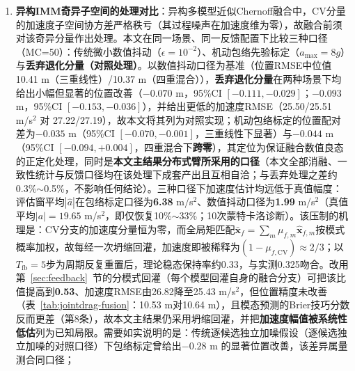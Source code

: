 \documentclass[UTF8,a4paper,zihao=-4]{ctexart}
\begin{document}
\begin{enumerate}
\item \textbf{异构IMM奇异子空间的处理对比}：异构多模型近似Chernoff融合中，CV分量的加速度子空间协方差严格秩亏（其过程噪声在加速度维为零），故融合前须对该奇异分量作出处理。本文在同一场景、同一反馈配置下比较三种口径（MC=50）：传统微小数值抖动（$\epsilon=10^{-2}$）、机动包络先验标定（$a_{\max}=8g$）与\textbf{丢弃退化分量（对照处理）}。以数值抖动口径为基准（位置RMSE中位值10.41 m（三重线性）/10.37 m（四重混合）），\textbf{丢弃退化分量}在两种场景下均给出小幅但显著的位置改善（$-0.070$ m，95\%CI $[-0.111,-0.029]$；$-0.093$ m，95\%CI $[-0.153,-0.036]$），并给出更低的加速度RMSE（25.50/25.51 m/s$^2$ 对 27.22/27.19），故本文将其列为对照实现；机动包络标定的位置配对差为$-0.035$ m（95\%CI $[-0.070,-0.001]$，三重线性下显著）与$-0.044$ m（95\%CI $[-0.094,+0.004]$，四重混合下\textbf{跨零}），其定位为保证融合数值良态的正定化处理，同时是\textbf{本文主结果分布式臂所采用的口径}（本文全部消融、一致性统计与反馈口径均在该处理下成套产出且互相自洽；与丢弃处理之差约0.3\%$\sim$0.5\%，不影响任何结论）。三种口径下加速度估计均远低于真值幅度：评估窗平均$|\hat a|$在包络标定口径为\textbf{6.38} m/s$^2$、数值抖动口径为\textbf{1.99} m/s$^2$（真值平均$|a|=19.65$ m/s$^2$，即仅恢复10\%$\sim$33\%；10次蒙特卡洛诊断）。该压制的机理是：CV分支的加速度分量恒为零，而全局矩匹配$\bar{\boldsymbol x}_f=\sum_m\mu_{f,m}\hat{\boldsymbol x}_{f,m}$按模式概率加权，故每经一次坍缩回灌，加速度即被稀释为$(1-\mu_{f,\mathrm{CV}})\approx2/3$；以$T_{\mathrm{fb}}=5$步为周期反复重置后，理论稳态保持率约0.33，与实测0.325吻合。改用第~\ref{sec:feedback}~节的分模式回灌（每个模型回灌自身的融合分支）可把该比值提高到\textbf{0.53}、加速度RMSE由26.82降至25.43 m/s$^2$，但位置精度未改善（表~\ref{tab:jointdrag-fusion}：10.53 m对10.64 m），且模态预测的Brier技巧分数反而更差（第8条），故本文主结果仍采用坍缩回灌，并把\textbf{加速度幅值被系统性低估}列为已知局限。需要如实说明的是：传统逐候选独立加噪假设（逐候选独立加噪的对照口径）下包络标定曾给出$-0.28$ m 的显著位置改善，该差异属量测合同口径；

\end{enumerate}
\end{document}
